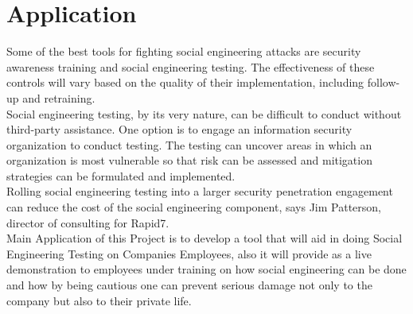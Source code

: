 \section{Application}
Some of the best tools for fighting social engineering attacks are security awareness training and social engineering testing. The effectiveness of these controls will vary based on the quality of their implementation, including follow-up and retraining.\\[0.5cm]
Social engineering testing, by its very nature, can be difficult to conduct without third-party assistance. One option is to engage an information security organization to conduct testing. The testing can uncover areas in which an organization is most vulnerable so that risk can be assessed and mitigation strategies can be formulated and implemented.\\[0.5cm]
Rolling social engineering testing into a larger security penetration engagement can reduce the cost of the social engineering component, says Jim Patterson, director of consulting for Rapid7.\cite{link_humanweak}\\[0.5cm]
Main Application of this Project is to develop a tool that will aid in doing Social Engineering Testing on Companies Employees, also it will provide as a live demonstration to employees under training on how social engineering can be done and how by being cautious one can prevent serious damage not only to the company but also to their private life.\\[0.5cm]